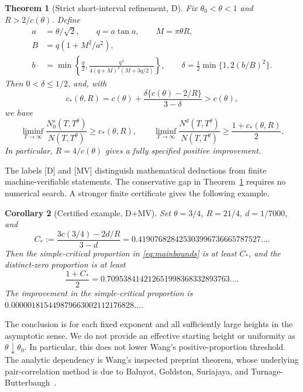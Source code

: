 \documentclass[11pt]{article}
\newtheorem{theorem}{Theorem}[section]
\newtheorem{corollary}[theorem]{Corollary}
\theoremstyle{remark}
\begin{document}
\begin{theorem}[Strict short-interval refinement, D]\label{thm:main}
Fix $\theta_0<\theta<1$ and $R>2/c(\theta)$. Define
\begin{equation}\label{eq:explicit}
\begin{aligned}
 a&=\theta/\sqrt2,\qquad q=a\tan a,\qquad M=\pi\theta R,\\
 B&=q(1+M^2/a^2),\\
 b&=\min\left\{\frac q2,
       \frac{q^4}{4(q+M)^2(M+3q/2)}\right\},\qquad
 \delta=\frac12\min\{1,2(b/B)^2\}.
\end{aligned}
\end{equation}
Then $0<\delta\le1/2$, and, with
\begin{equation}\label{eq:cstar}
 c_*(\theta,R)=c(\theta)
       +\frac{\delta\{c(\theta)-2/R\}}{3-\delta}>c(\theta),
\end{equation}
we have
\begin{equation}\label{eq:mainbounds}
 \liminf_{T\to\infty}\frac{N_0^s(T,T^\theta)}{N(T,T^\theta)}
 \ge c_*(\theta,R),\qquad
 \liminf_{T\to\infty}\frac{N^d(T,T^\theta)}{N(T,T^\theta)}
 \ge\frac{1+c_*(\theta,R)}2.
\end{equation}
In particular, $R=4/c(\theta)$ gives a fully specified positive improvement.
\end{theorem}

The labels [D] and [MV] distinguish mathematical deductions from finite
machine-verifiable statements. The conservative gap in
Theorem~\ref{thm:main} requires no numerical search. A stronger finite
certificate gives the following example.

\begin{corollary}[Certified example, D+MV]\label{cor:example}
Set $\theta=3/4$, $R=21/4$, $d=1/7000$, and
\[
 C_*:=\frac{3c(3/4)-2d/R}{3-d}
 =0.419076828425303996736665787527\ldots.
\]
Then the simple-critical proportion in \eqref{eq:mainbounds} is at least
$C_*$, and the distinct-zero proportion is at least
\[
 \frac{1+C_*}2=0.709538414212651998368332893763\ldots.
\]
The improvement in the simple-critical proportion is
$0.000001815449879663002112176828\ldots$.
\end{corollary}

The conclusion is for each fixed exponent and all sufficiently large
heights in the asymptotic sense. We do not provide an effective starting
height or uniformity as $\theta\downarrow\theta_0$. In particular, this
does not lower Wang's positive-proportion threshold. The analytic dependency
is Wang's inspected preprint theorem, whose underlying pair-correlation
method is due to Baluyot, Goldston, Suriajaya, and
Turnage-Butterbaugh~\cite{BGSTB,BGSTBcorrection}.
\end{document}
